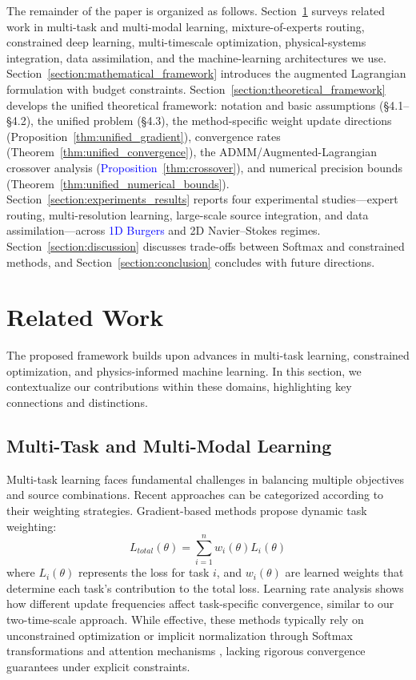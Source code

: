 \documentclass[preprint,12pt,authoryear]{elsarticle}
\begin{document}
The remainder of the paper is organized as follows.
Section~\ref{section:related_work} surveys related work in multi-task and multi-modal learning,
mixture-of-experts routing, constrained deep learning, multi-timescale
optimization, physical-systems integration, data assimilation, and the
machine-learning architectures we use. Section~\ref{section:mathematical_framework} introduces the augmented
Lagrangian formulation with budget constraints. Section~\ref{section:theoretical_framework} develops the
unified theoretical framework: notation and basic assumptions (\S4.1--\S4.2), the unified problem (\S4.3), the method-specific weight update directions (Proposition~\ref{thm:unified_gradient}), convergence rates (Theorem~\ref{thm:unified_convergence}), the ADMM/Augmented-Lagrangian crossover analysis (\textcolor{blue}{Proposition}~\ref{thm:crossover}), and numerical precision bounds (Theorem~\ref{thm:unified_numerical_bounds}). Section~\ref{section:experiments_results} reports four experimental studies---expert routing, multi-resolution learning, large-scale
source integration, and data assimilation---across \textcolor{blue}{1D Burgers} and 2D
Navier--Stokes regimes. Section~\ref{section:discussion} discusses trade-offs between Softmax and constrained methods, and Section~\ref{section:conclusion} concludes with future directions.


\section{Related Work}
\label{section:related_work}

The proposed framework builds upon advances in multi-task learning, constrained optimization, and physics-informed machine learning. In this section, we contextualize our contributions within these domains, highlighting key connections and distinctions.

\subsection{Multi-Task and Multi-Modal Learning}
Multi-task learning faces fundamental challenges in balancing multiple objectives and source combinations. Recent approaches can be categorized according to their weighting strategies. Gradient-based methods \cite{yu2020gradient} propose dynamic task weighting:
\begin{equation}
    L_{total}(\theta) = \sum_{i=1}^n w_i(\theta) L_i(\theta)
\end{equation}
where $L_i(\theta)$ represents the loss for task $i$, and $w_i(\theta)$ are learned weights that determine each task's contribution to the total loss. Learning rate analysis \cite{wang2023understanding} shows how different update frequencies affect task-specific convergence, similar to our two-time-scale approach. While effective, these methods typically rely on unconstrained optimization \cite{chen2023automated} or implicit normalization through Softmax transformations \cite{kendall2018multi} and attention mechanisms \cite{dosovitskiy2021image}, lacking rigorous convergence guarantees under explicit constraints.
\end{document}
